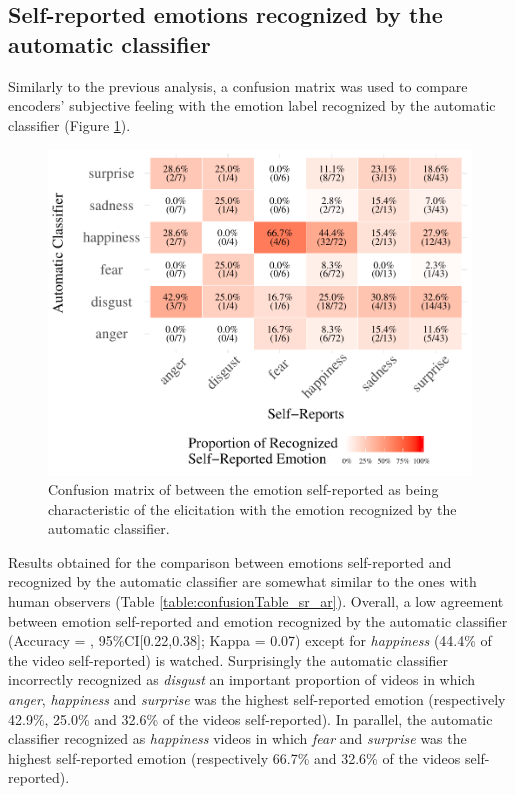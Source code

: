 \documentclass[conference,final,]{IEEEtran}
\makeatletter
\def\maxwidth{\ifdim\Gin@nat@width>\linewidth\linewidth
\else\Gin@nat@width\fi}
\let\Oldincludegraphics\includegraphics
\renewcommand{\includegraphics}[1]{\Oldincludegraphics[width=\maxwidth]{#1}}
\makeatother
\begin{document}
\hypertarget{self-reported-emotions-recognized-by-the-automatic-classifier}{%
\subsection{Self-reported emotions recognized by the automatic
classifier}\label{self-reported-emotions-recognized-by-the-automatic-classifier}}

Similarly to the previous analysis, a confusion matrix was used to
compare encoders' subjective feeling with the emotion label recognized
by the automatic classifier (Figure \ref{fig:confusionMatrix_sr_ar}).

\begin{figure}
\centering
\includegraphics{ACII_2019_paper_files/figure-latex/confusionMatrix_sr_ar-1.pdf}
\caption{\label{fig:confusionMatrix_sr_ar}Confusion matrix of between
the emotion self-reported as being characteristic of the elicitation
with the emotion recognized by the automatic classifier.}
\end{figure}

Results obtained for the comparison between emotions self-reported and
recognized by the automatic classifier are somewhat similar to the ones
with human observers (Table \ref{table:confusionTable_sr_ar}). Overall,
a low agreement between emotion self-reported and emotion recognized by
the automatic classifier (Accuracy \nolinebreak = ,
95\%CI{[}0.22,0.38{]}; Kappa = 0.07) except for \emph{happiness} (44.4\%
of the video self-reported) is watched. Surprisingly the automatic
classifier incorrectly recognized as \emph{disgust} an important
proportion of videos in which \emph{anger}, \emph{happiness} and
\emph{surprise} was the highest self-reported emotion (respectively
42.9\%, 25.0\% and 32.6\% of the videos self-reported). In parallel, the
automatic classifier recognized as \emph{happiness} videos in which
\emph{fear} and \emph{surprise} was the highest self-reported emotion
(respectively 66.7\% and 32.6\% of the videos self-reported).
\end{document}
